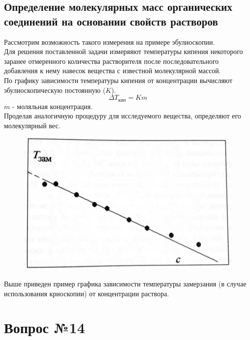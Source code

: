 \documentclass[14pt,a4paper]{scrartcl}
\begin{document}
\subsection*{Определение молекулярных масс органических соединений на основании свойств растворов}
Рассмотрим возможность такого измерения на примере эбулиоскопии. \\
Для решения поставленной задачи измеряяют температуры кипения некоторого заранее отмеренного количества растворителя после последовательного добавления к нему навесок вещества с известной молекулярной массой. \\
По графику зависимости температуры кипения от концентрации вычисляют эбулиоскопическую постоянную ($K$).
$$ \Delta{T}_{\text{кип}} = Km  $$
$m$ - моляльная концентрация. \\
Проделав аналогичную процедуру для исследуемого вещества, определяют его молекулярный вес.
\begin{figure}[H]
	\centering
	\includegraphics[scale=0.5]{cryoscopy}
	\label{}
\end{figure}
Выше приведен пример графика зависимости температуры замерзания (в случае использования криоскопии) от концентрации раствора.


\section*{Вопрос №14}
\end{document}
